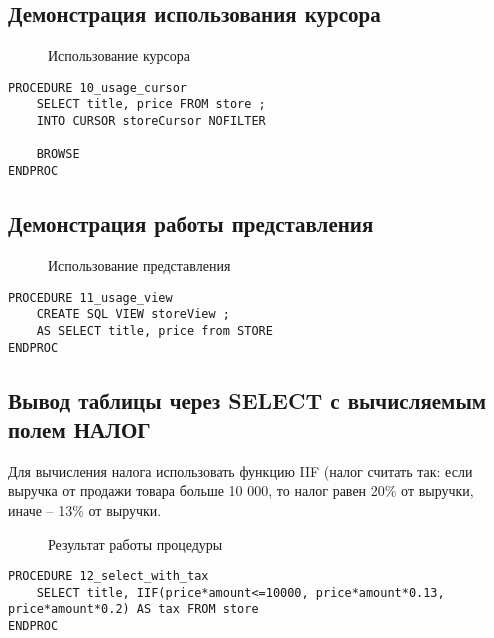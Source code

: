 \subsection{Демонстрация использования курсора}

\begin{figure}[h!t]
  \caption{Использование курсора}
\end{figure}

\begin{lstlisting}[float,caption=Source code]
PROCEDURE 10_usage_cursor
	SELECT title, price FROM store ;
	INTO CURSOR storeCursor NOFILTER
	
	BROWSE
ENDPROC
\end{lstlisting}


\subsection{Демонстрация работы представления}

\begin{figure}[h!t]
  \caption{Использование представления}
\end{figure}

\begin{lstlisting}[float,caption=Source code]
PROCEDURE 11_usage_view
	CREATE SQL VIEW storeView ;
	AS SELECT title, price from STORE
ENDPROC
\end{lstlisting}


\subsection{Вывод таблицы через SELECT с вычисляемым полем НАЛОГ}

  Для вычисления налога использовать функцию IIF (налог считать так: если выручка от
  продажи товара больше 10 000, то налог равен 20\% от выручки, иначе – 13\% от
  выручки.

  \begin{figure}[h!t]
    \caption{Результат работы процедуры}
  \end{figure}

\begin{lstlisting}[float,caption=Source code]
PROCEDURE 12_select_with_tax
	SELECT title, IIF(price*amount<=10000, price*amount*0.13, price*amount*0.2) AS tax FROM store
ENDPROC
\end{lstlisting}
